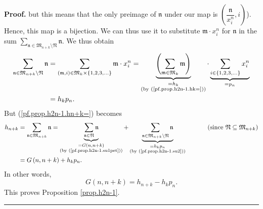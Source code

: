 \documentclass[numbers=enddot,12pt,final,onecolumn,notitlepage]{scrartcl}%
\theoremstyle{definition}
\newenvironment{proof}[1][Proof]{\noindent\textbf{#1.} }{\ \rule{0.5em}{0.5em}}
\let\sumnonlimits\sum
\renewcommand{\sum}{\sumnonlimits\limits}
\begin{document}
\begin{proof}
but this means that the only preimage of $\mathfrak{n}$ under our map is
$\left(  \dfrac{\mathfrak{n}}{x_{i}^{n}},i\right)  $). Hence, this map is a
bijection. We can thus use it to substitute $\mathfrak{m}\cdot x_{i}^{n}$ for
$\mathfrak{n}$ in the sum $\sum_{\mathfrak{n}\in\mathfrak{M}_{n+k}%
\setminus\mathfrak{N}}\mathfrak{n}$. We thus obtain%
\begin{align}
\sum_{\mathfrak{n}\in\mathfrak{M}_{n+k}\setminus\mathfrak{N}}\mathfrak{n} &
=\sum_{\left(  \mathfrak{m},i\right)  \in\mathfrak{M}_{k}\times\left\{
1,2,3,\ldots\right\}  }\mathfrak{m}\cdot x_{i}^{n}=\underbrace{\left(
\sum_{\mathfrak{m}\in\mathfrak{M}_{k}}\mathfrak{m}\right)  }_{\substack{=h_{k}%
\\\text{(by (\ref{pf.prop.h2n-1.hk=}))}}}\cdot\underbrace{\sum_{i\in\left\{
1,2,3,\ldots\right\}  }x_{i}^{n}}_{=p_{n}}\nonumber\\
&  =h_{k}p_{n}.\label{pf.prop.h2n-1.su2}%
\end{align}
But (\ref{pf.prop.h2n-1.hn+k=}) becomes%
\begin{align*}
h_{n+k} &  =\sum_{\mathfrak{n}\in\mathfrak{M}_{n+k}}\mathfrak{n}%
=\underbrace{\sum_{\mathfrak{n}\in\mathfrak{N}}\mathfrak{n}}%
_{\substack{=G\left(  n,n+k\right)  \\\text{(by (\ref{pf.prop.h2n-1.su1pet}%
))}}}+\underbrace{\sum_{\mathfrak{n}\in\mathfrak{M}_{n+k}\setminus
\mathfrak{N}}\mathfrak{n}}_{\substack{=h_{k}p_{n}\\\text{(by
(\ref{pf.prop.h2n-1.su2}))}}}\ \ \ \ \ \ \ \ \ \ \left(  \text{since
}\mathfrak{N}\subseteq\mathfrak{M}_{n+k}\right)  \\
&  =G\left(  n,n+k\right)  +h_{k}p_{n}.
\end{align*}
In other words,%
\[
G\left(  n,n+k\right)  =h_{n+k}-h_{k}p_{n}.
\]
This proves Proposition \ref{prop.h2n-1}.
\end{proof}
\end{document}
